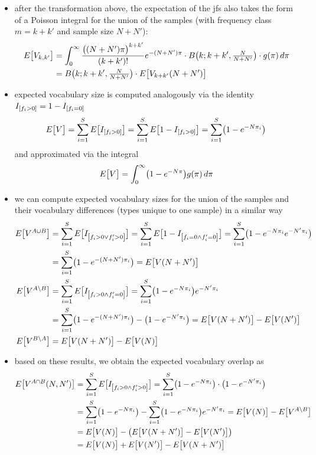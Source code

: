 \documentclass[a4paper]{article}
\begin{document}
\begin{itemize}
  \[
    \Exp{V_m} = \int_0^{\infty} \frac{(N\pi)^m}{m!} e^{-N\pi} g(\pi) \dpi
  \]
\item after the transformation above, the expectation of the jfs also takes the form of a Poisson integral for the union of the samples (with frequency class $m = k + k'$ and sample size $N + N'$):
  \begin{align*}
    E_{}\bigl[V_{k, k'}\bigr]
    &= \int_0^{\infty} \frac{\bigl( (N + N') \pi \bigr)^{k + k'}}{(k + k')!} e^{-(N + N')\pi}
      \cdot B\bigl(k; k + k', \tfrac{N}{N + N'}\bigr) \cdot g(\pi) \,d\pi \\
    &= B\bigl(k; k + k', \tfrac{N}{N + N'}\bigr)\cdot E_{}\bigl[V_{k+k'}(N + N')\bigr]
  \end{align*}
\item expected vocabulary size is computed analogously via the identity $I_{\left[f_i > 0\right]} = 1 - I_{\left[f_i = 0\right]}$
  \[
    E_{}\bigl[V\bigr] = \sum_{i=1}^{S} E_{}\bigl[I_{\left[f_i > 0\right]}\bigr] = \sum_{i=1}^{S} E_{}\bigl[1 - I_{\left[f_i > 0\right]}\bigr]
    = \sum_{i=1}^{S} \bigl( 1 - e^{-N \pi_i} \bigr)
  \]
  and approximated via the integral
  \[
    E_{}\bigl[V\bigr] = \int_0^{\infty} \bigl( 1 - e^{-N\pi} \bigr) g(\pi) \,d\pi
  \]
\item we can compute expected vocabulary sizes for the union of the samples and their vocabulary differences (types unique to one sample) in a similar way
  \begin{align*}
    E_{}\bigl[V^{A\cup B}\bigr]
    &= \sum_{i=1}^{S} E_{}\bigl[I_{\left[f_i > 0\vee f'_i > 0\right]}\bigr] = \sum_{i=1}^{S} E_{}\bigl[1 - I_{\left[f_i = 0\wedge f'_i = 0\right]}\bigr]
      = \sum_{i=1}^{S} \bigl( 1 - e^{-N \pi_i} e^{-N' \pi_i} \bigr) \\
    &= \sum_{i=1}^{S} \bigl( 1 - e^{-(N + N') \pi_i} \bigr) = E_{}\bigl[V(N + N')\bigr] \\
    E_{}\bigl[V^{A\setminus B}\bigr]
    &= \sum_{i=1}^{S} E_{}\bigl[I_{\left[f_i > 0\wedge f'_i = 0\right]}\bigr]
      = \sum_{i=1}^{S} \bigl( 1 - e^{-N \pi_i} \bigr) e^{-N' \pi_i} \\
    &= \sum_{i=1}^{S} \bigl( 1 - e^{-(N + N') \pi_i} \bigr) - \bigl( 1 - e^{-N' \pi_i} \bigr)
      = E_{}\bigl[V(N + N')\bigr] - E_{}\bigl[V(N')\bigr] \\
    E_{}\bigl[V^{B\setminus A}\bigr]
    &= E_{}\bigl[V(N + N')\bigr] - E_{}\bigl[V(N)\bigr] 
  \end{align*}
\item based on these results, we obtain the expected vocabulary overlap as
  \begin{align*}
    E_{}\bigl[V^{A\cap B}(N, N')\bigr]
    &= \sum_{i=1}^{S} E_{}\bigl[I_{\left[f_i > 0\wedge f'_i > 0\right]}\bigr]
      = \sum_{i=1}^{S} \bigl( 1 - e^{-N \pi_i} \bigr) \cdot \bigl( 1 - e^{-N' \pi_i} \bigr) \\
    & = \sum_{i=1}^{S} \bigl( 1 - e^{-N \pi_i} \bigr) - \sum_{i=1}^{S} \bigl( 1 - e^{-N \pi_i} \bigr) e^{-N' \pi_i}
      = E_{}\bigl[V(N)\bigr] - E_{}\bigl[V^{A\setminus B}\bigr] \\
    &= E_{}\bigl[V(N)\bigr] - \bigl( E_{}\bigl[V(N + N')\bigr] - E_{}\bigl[V(N')\bigr] \bigr) \\
     &= E_{}\bigl[V(N)\bigr] + E_{}\bigl[V(N')\bigr] - E_{}\bigl[V(N + N')\bigr]
  \end{align*}
\end{itemize}
\end{document}
